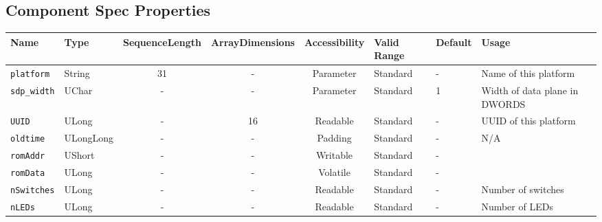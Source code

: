 \documentclass{article}
\begin{document}
\begin{landscape}
	\section*{Component Spec Properties}
	\begin{scriptsize}
		\begin{tabular}{|p{3cm}|p{1.5cm}|c|c|c|p{1.5cm}|p{1cm}|p{6cm}|}
			\hline
			\rowcolor{blue}
			Name               & Type   & SequenceLength & ArrayDimensions & Accessibility      & Valid Range & Default & Usage                                                                         \\
			\hline
			\verb+platform+    & String & 31             & -               & Parameter & Standard & - & Name of this platform                                                     \\
			\hline
			\verb+sdp_width+   & UChar  & -              & -               & Parameter & Standard & 1 & Width of data plane in DWORDS                                             \\
			\hline
			\verb+UUID+        & ULong  & -              & 16              & Readable           & Standard    & -       & UUID of this platform                                                         \\
			\hline
			\verb+oldtime+     & ULongLong & -           & -               & Padding            & Standard    & -       & N/A                                                                           \\
			\hline
			\verb+romAddr+     & UShort & -              & -               & Writable           & Standard    & -       &                                                                               \\
			\hline
			\verb+romData+     & ULong  & -              & -               & Volatile           & Standard    & -       &                                                                               \\
			\hline
			\verb+nSwitches+   & ULong  & -              & -               & Readable           & Standard    & -       & Number of switches                                                            \\
			\hline
			\verb+nLEDs+       & ULong  & -              & -               & Readable           & Standard    & -       & Number of LEDs                                                                 \\
			\hline

\end{tabular}
\end{scriptsize}
\end{landscape}
\end{document}
